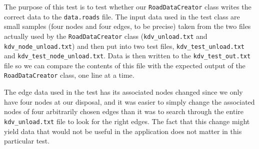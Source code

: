 The purpose of this test is to test whether our \texttt{RoadDataCreator} class writes the correct data to the \texttt{data.roads} file. The input data used in the test class are small samples (four nodes and four edges, to be precise) taken from the two files actually used by the \texttt{RoadDataCreator} class (\texttt{kdv\_unload.txt} and \texttt{kdv\_node\_unload.txt}) and then put into two test files, \texttt{kdv\_test\_unload.txt} and \texttt{kdv\_test\_node\_unload.txt}. Data is then written to the \texttt{kdv\_test\_out.txt} file so we can compare the contents of this file with the expected output of the \texttt{RoadDataCreator} class, one line at a time.

The edge data used in the test has its associated nodes changed since we only have four nodes at our disposal, and it was easier to simply change the associated nodes of four arbitrarily chosen edges than it was to search through the entire \texttt{kdv\_unload.txt} file to look for the right edges. The fact that this change might yield data that would not be useful in the application does not matter in this particular test.
